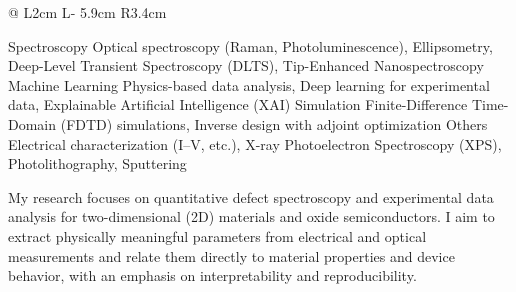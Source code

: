 \documentclass[11pt, a4paper]{awesome-cv}
\makeatletter
\renewenvironment{cvhonors}{%
  \vspace{\acvSectionContentTopSkip}
  \vspace{-2mm}
  \begin{center}
    \setlength\tabcolsep{0pt}
    \setlength{\extrarowheight}{0pt}
    \begin{tabular*}{\textwidth}{@{\extracolsep{\fill}} L{2cm} L{\textwidth - 5.9cm} R{3.4cm}}
}{%
    \end{tabular*}
  \end{center}
}
\makeatother
\begin{document}
\begin{cvhonors}
\end{cvhonors}


\begin{cvskills}
  \cvskill
    {Spectroscopy}
    {Optical spectroscopy (Raman, Photoluminescence), Ellipsometry, Deep-Level Transient Spectroscopy (DLTS), Tip-Enhanced Nanospectroscopy}
  \cvskill
    {Machine Learning}
    {Physics-based data analysis, Deep learning for experimental data, Explainable Artificial Intelligence (XAI)}
  \cvskill
    {Simulation}
    {Finite-Difference Time-Domain (FDTD) simulations, Inverse design with adjoint optimization}
  \cvskill
    {Others}
    {Electrical characterization (I--V, etc.), X-ray Photoelectron Spectroscopy (XPS), Photolithography, Sputtering}
\end{cvskills}


\begin{cvparagraph}
My research focuses on quantitative defect spectroscopy and experimental data analysis for two-dimensional (2D) materials and oxide semiconductors. I aim to extract physically meaningful parameters from electrical and optical measurements and relate them directly to material properties and device behavior, with an emphasis on interpretability and reproducibility.
\end{cvparagraph}
\end{document}
